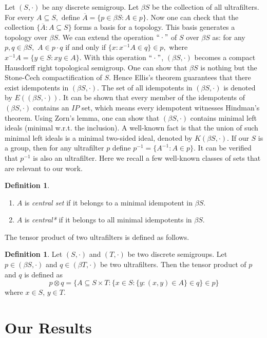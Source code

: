 \documentclass{article}
\theoremstyle{Theorem}
\theoremstyle{definition}
\newtheorem{defn}[thm]{Definition}
\begin{document}
Let  $(S,\cdot)$ be any discrete semigroup. Let $\beta S$ be the collection of all ultrafilters. For every $A\subseteq S,$ define $\overline{A}=\{p\in \beta S: A\in p\}.$ Now one can check that the collection $\{\overline{A}: A\subseteq S\}$ forms a basis for a topology. This basis generates a topology over $\beta S.$  We can extend the operation $``\cdot "$ of $S$ over $\beta S$  as: for any $p,q\in \beta S,$ $A\in p\cdot q$ if and only if $\{x:x^{-1}A\in q\}\in p,$ where $x^{-1}A=\{y\in S: xy\in A\}.$ With this operation $``\cdot "$, $(\beta S,\cdot)$ becomes a compact Hausdorff right topological semigroup. One can show that $\beta S$ is nothing but the Stone-\v{C}ech compactification of $S.$ Hence Ellis's theorem guarantees that there exist idempotents in $(\beta S,\cdot)$. The set of all idempotents in $(\beta S,\cdot)$ is denoted by $E\left((\beta S,\cdot)\right).$
It can be shown that every member of the idempotents of $(\beta S,\cdot)$ contains an $IP$ set, which means every idempotent witnesses  Hindman's theorem. Using Zorn's lemma, one can show that $(\beta S,\cdot)$ contains minimal left ideals (minimal w.r.t. the inclusion).  A well-known fact is that the union of such minimal left ideals is a minimal two-sided ideal, denoted by $K(\beta S,\cdot).$ If our $S$ is a group, then for any ultrafilter $p$ define $p^{-1}=\{A^{-1}:A\in p\}.$ It can be verified that $p^{-1}$ is also an ultrafilter. Here we recall a few well-known classes of sets that are relevant to our work. 

\begin{defn}\label{rev2defn}\text{}
\begin{enumerate}
 \item $A$ is {\it central set} if it belongs to a minimal idempotent in $\beta S$.
\item $A$ is {\it central*} if it belongs to all minimal idempotents in $\beta S$.
\end{enumerate}
\end{defn}
The tensor product of two ultrafilters is defined as follows.

\begin{defn} Let $(S,\cdot)$ and $(T,\cdot)$ be two discrete semigroups.
    Let $p\in (\beta S,\cdot )$ and  $q\in (\beta T,\cdot )$ be two ultrafilters. Then the tensor product of $p$ and $q$ is defined as
$$p\otimes q=\{A\subseteq S\times T: \{x\in S: \{y:(x,y)\in A\}\in q\}\in p\}$$
where $x\in S$, $y\in T.$
\end{defn}

\section{Our Results}
\end{document}
